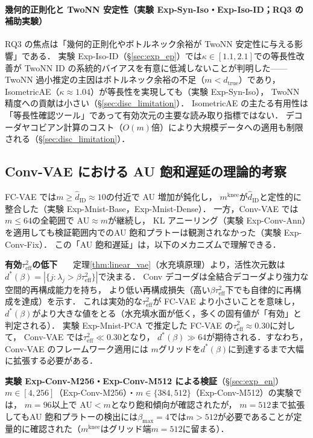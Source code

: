 \documentclass[11pt,a4paper]{jsarticle}
\newcommand{\kap}{\kappa}
\newcommand{\mknee}{m^{\mathrm{knee}}}
\begin{document}
\paragraph{幾何的正則化と TwoNN 安定性（実験 Exp-Syn-Iso・Exp-Iso-ID；RQ3 の補助実験）}
RQ3 の焦点は「幾何的正則化やボトルネック余裕が TwoNN 安定性に与える影響」である．
実験 Exp-Iso-ID（§\ref{sec:exp_ep}）では$\kap \in [1.1, 2.1]$での等長性改善が
TwoNN ID の系統的バイアスを有意に低減しないことが判明した——
TwoNN 過小推定の主因はボトルネック余裕の不足（$m < d_\mathrm{true}$）であり，
IsometricAE（$\kap \approx 1.04$）が等長性を実現しても（実験 Exp-Syn-Iso），
TwoNN 精度への貢献は小さい（§\ref{sec:disc_limitation}）．
IsometricAE の主たる有用性は「等長性確認ツール」であって有効次元の主要な読み取り指標ではない．
デコーダヤコビアン計算のコスト（$O(m)$倍）により大規模データへの適用も制限される（§\ref{sec:disc_limitation}）．

\subsection{Conv-VAE における AU 飽和遅延の理論的考察}\label{sec:disc_convvae}

FC-VAE では$m \geq \hat{d}_\mathrm{ID} \approx 10$の付近で AU 増加が鈍化し，
$\mknee$が$\hat{d}_\mathrm{ID}$と定性的に整合した（実験 Exp-Mnist-Base，Exp-Mnist-Dense）．
一方，Conv-VAE では$m \leq 64$の全範囲で AU$\approx m$が継続し，
KL アニーリング（実験 Exp-Conv-Ann）を適用しても検証範囲内でのAU 飽和プラトーは観測されなかった（実験 Exp-Conv-Fix）．
この「AU 飽和遅延」は，以下のメカニズムで理解できる．

\textbf{有効$\tau^2_\mathrm{eff}$の低下}~~~
定理\ref{thm:linear_vae}（水充填原理）より，活性次元数は
$d^*(\beta) = |\{j : \lambda_j > \beta\tau^2_\mathrm{eff}\}|$で決まる．
Conv デコーダは全結合デコーダより強力な空間的再構成能力を持ち，
より低い再構成損失（高い$\beta\tau^2_\mathrm{eff}$下でも自律的に再構成を達成）を示す．
これは実効的な$\tau^2_\mathrm{eff}$が FC-VAE より小さいことを意味し，
$d^*(\beta)$がより大きな値をとる（水充填水面が低く，多くの固有値が「有効」と判定される）．
実験 Exp-Mnist-PCA で推定した FC-VAE の$\tau^2_\mathrm{eff} \approx 0.30$に対して，
Conv-VAE では$\tau^2_\mathrm{eff} \ll 0.30$となり，
$d^*(\beta) \gg 64$が期待される．すなわち，Conv-VAE のフレームワーク適用には
$m$グリッドを$d^*(\beta)$に到達するまで大幅に拡張する必要がある．

\textbf{実験 Exp-Conv-M256・Exp-Conv-M512 による検証}（§\ref{sec:exp_en}）~~~
$m \in [4,256]$（Exp-Conv-M256）・$m \in \{384,512\}$（Exp-Conv-M512）の実験では，
$m = 96$以上で AU$<m$となり飽和傾向が確認されたが，
$m=512$まで拡張してもAU 飽和プラトーの検出には$\beta_{\max}=4$では$m>512$が必要であることが定量的に確認された（$\mknee$はグリッド端$m=512$に留まる）．
\end{document}

